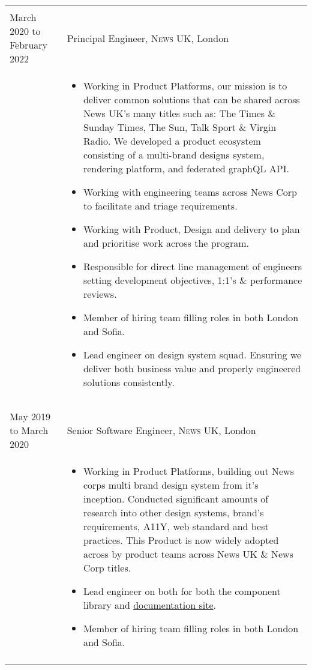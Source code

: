 \documentclass[a4paper,10pt]{article} %
\begin{document}
\begin{tabular}{ L{2cm} | L{11cm}}
	 \\
	March 2020 to February 2022 & Principal Engineer, \textsc{News UK}, London \\
	&\MPtrue
	\begin{itemize}[leftmargin=*]
			\item Working in Product Platforms, our mission is to deliver common solutions that can be shared across News UK's many titles such as: The Times \& Sunday Times, The Sun, Talk Sport \& Virgin Radio. We developed a product ecosystem consisting of a multi-brand designs system, rendering platform, and federated graphQL API.
			\item Working with engineering teams across News Corp to facilitate and triage requirements.
			\item Working with Product, Design and delivery to plan and prioritise work across the program.
			\item Responsible for direct line management of engineers setting development objectives, 1:1's \& performance reviews.
			\item Member of hiring team filling roles in both London and Sofia.
			\item Lead engineer on design system squad. Ensuring we deliver both business value and properly engineered solutions consistently.
		\end{itemize} \\ 
	 \\

	 \\
	May 2019 to March 2020 & Senior Software Engineer, \textsc{News UK}, London \\
	&\MPtrue
	\begin{itemize}[leftmargin=*]
			\item Working in Product Platforms, building out News corps multi brand design system from it's inception. Conducted significant amounts of research into other design systems, brand's requirements, A11Y, web standard and best practices. This Product is now widely adopted across by product teams across News UK \& News Corp titles.
			\item Lead engineer on both for both the component library and \href{https://newskit.co.uk}{documentation site}.
			\item Member of hiring team filling roles in both London and Sofia.			
		\end{itemize} \\
	 \\
\end{tabular}
\end{document}
